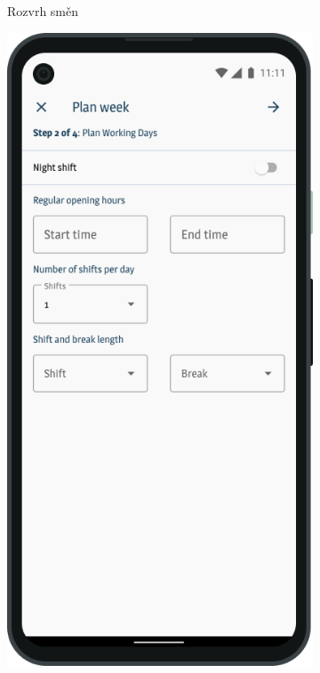 \documentclass[a4paper,11pt,openany,twoside]{book}
\begin{document}
\begin{figure}
\begin{subfigure}{0.34\textwidth}
				 \caption{Rozvrh směn}
				 \label{sub:android1}
  \end{subfigure}
		 \hspace{1em}
	\begin{subfigure}{0.34\textwidth}
				 \centering
				 \includegraphics[width=\textwidth]{img/plan-week.png}

\end{subfigure}
\end{figure}
\end{document}
